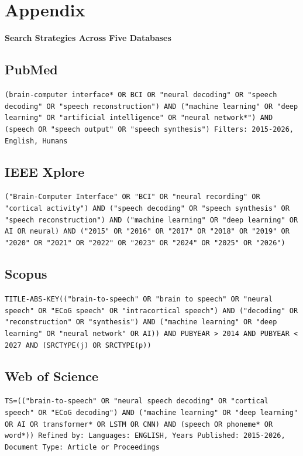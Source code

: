 
\appendix

\section{Appendix}


\textbf{Search Strategies Across Five Databases}
\label{app:search_strings}

\subsection{PubMed}
\texttt{(brain-computer interface* OR BCI OR "neural decoding" OR "speech decoding" OR "speech reconstruction") AND ("machine learning" OR "deep learning" OR "artificial intelligence" OR "neural network*") AND (speech OR "speech output" OR "speech synthesis") Filters: 2015-2026, English, Humans}

\subsection{IEEE Xplore}
\texttt{("Brain-Computer Interface" OR "BCI" OR "neural recording" OR "cortical activity") AND ("speech decoding" OR "speech synthesis" OR "speech reconstruction") AND ("machine learning" OR "deep learning" OR AI OR neural) AND ("2015" OR "2016" OR "2017" OR "2018" OR "2019" OR "2020" OR "2021" OR "2022" OR "2023" OR "2024" OR "2025" OR "2026")}

\subsection{Scopus}
\texttt{TITLE-ABS-KEY(("brain-to-speech" OR "brain to speech" OR "neural speech" OR "ECoG speech" OR "intracortical speech") AND ("decoding" OR "reconstruction" OR "synthesis") AND ("machine learning" OR "deep learning" OR "neural network" OR AI)) AND PUBYEAR > 2014 AND PUBYEAR < 2027 AND (SRCTYPE(j) OR SRCTYPE(p))}

\subsection{Web of Science}
\texttt{TS=(("brain-to-speech" OR "neural speech decoding" OR "cortical speech" OR "ECoG decoding") AND ("machine learning" OR "deep learning" OR AI OR transformer* OR LSTM OR CNN) AND (speech OR phoneme* OR word*)) Refined by: Languages: ENGLISH, Years Published: 2015-2026, Document Type: Article or Proceedings}

